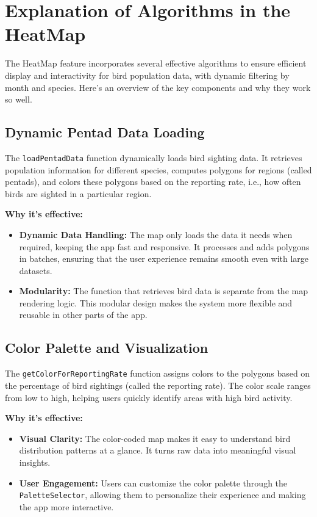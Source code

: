 \documentclass{article}
\begin{document}
\section{Explanation of Algorithms in the HeatMap}

The HeatMap feature incorporates several effective algorithms to ensure efficient display and interactivity for bird population data, with dynamic filtering by month and species. Here's an overview of the key components and why they work so well.

\subsection{Dynamic Pentad Data Loading}
The \texttt{loadPentadData} function dynamically loads bird sighting data. It retrieves population information for different species, computes polygons for regions (called pentads), and colors these polygons based on the reporting rate, i.e., how often birds are sighted in a particular region.

\textbf{Why it's effective:}
\begin{itemize}
    \item \textbf{Dynamic Data Handling:} The map only loads the data it needs when required, keeping the app fast and responsive. It processes and adds polygons in batches, ensuring that the user experience remains smooth even with large datasets.
    \item \textbf{Modularity:} The function that retrieves bird data is separate from the map rendering logic. This modular design makes the system more flexible and reusable in other parts of the app.
\end{itemize}

\subsection{Color Palette and Visualization}
The \texttt{getColorForReportingRate} function assigns colors to the polygons based on the percentage of bird sightings (called the reporting rate). The color scale ranges from low to high, helping users quickly identify areas with high bird activity.

\textbf{Why it's effective:}
\begin{itemize}
    \item \textbf{Visual Clarity:} The color-coded map makes it easy to understand bird distribution patterns at a glance. It turns raw data into meaningful visual insights.
    \item \textbf{User Engagement:} Users can customize the color palette through the \texttt{PaletteSelector}, allowing them to personalize their experience and making the app more interactive.
\end{itemize}
\end{document}
